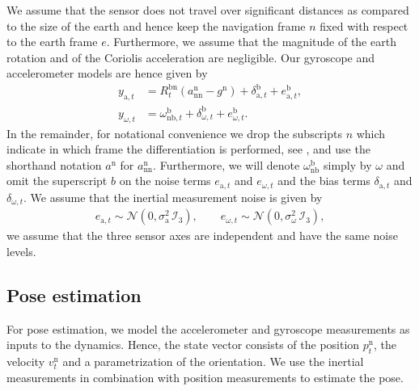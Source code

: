 We assume that the sensor does not travel over significant distances as compared to the size of the earth and hence keep the navigation frame $n$ fixed with respect to the earth frame $e$. Furthermore, we assume that the magnitude of the earth rotation and of the Coriolis acceleration are negligible. Our gyroscope and accelerometer models are hence given by 
\begin{subequations}
\begin{align}
y_{\text{a},t} &= R^{\text{bn}}_t  ( a_{\text{nn}}^\text{n} - g^\text{n} ) + \delta_{\text{a},t}^\text{b} + e_{\text{a},t}^\text{b}, \label{eq:models-accMeasModelRes} \\
y_{\omega,t} &= \omega_{\text{nb},t}^\text{b} + \delta_{\omega,t}^\text{b} + e_{\omega,t}^\text{b}. \label{eq:models-gyrMeasModelRes}
\end{align}
\end{subequations}
In the remainder, for notational convenience we drop the subscripts $n$ which indicate in which frame the differentiation is performed, see , and use the shorthand notation $a^\text{n}$ for $a_{\text{nn}}^\text{n}$. Furthermore, we will denote $\omega_{\text{nb}}^\text{b}$ simply by $\omega$ and omit the superscript $b$ on the noise terms $e_{\text{a},t}$ and $e_{\omega,t}$ and the bias terms $\delta_{\text{a},t}$ and $\delta_{\omega,t}$. We assume that the inertial measurement noise is given by
\begin{align}
e_{\text{a},t} \sim \mathcal{N}(0, \sigma_\text{a}^2 \, \mathcal{I}_3 ), \qquad e_{\omega,t} \sim \mathcal{N}(0, \sigma_\omega^2 \, \mathcal{I}_3 ),
\label{eq:models-assumptionNoiseDiag}
\end{align}
\ie we assume that the three sensor axes are independent and have the same noise levels. 

\subsection{Pose estimation}
For pose estimation, we model the accelerometer and gyroscope measurements as inputs to the dynamics. Hence, the state vector consists of the position $p^\text{n}_{t}$, the velocity $v^\text{n}_{t}$ and a parametrization of the orientation. We use the inertial measurements in combination with position measurements to estimate the pose. 

